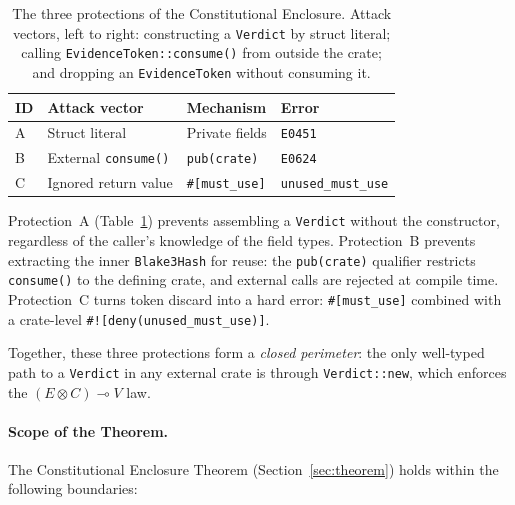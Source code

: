 \begin{table}[t]
\caption{The three protections of the Constitutional Enclosure.  Attack
vectors, left to right: constructing a \texttt{Verdict} by struct literal;
calling \texttt{EvidenceToken::consume()} from outside the crate; and
dropping an \texttt{EvidenceToken} without consuming it.}
\label{tab:protections}
\footnotesize
\begin{tabular}{@{}llll@{}}
\hline
\textbf{ID} & \textbf{Attack vector} & \textbf{Mechanism} & \textbf{Error} \\
\hline
A & Struct literal & Private fields & \texttt{E0451} \\
B & External \texttt{consume()} & \texttt{pub(crate)} & \texttt{E0624} \\
C & Ignored return value & \texttt{\#[must\_use]} & \texttt{unused\_must\_use} \\
\hline
\end{tabular}
\end{table}

Protection~A (Table~\ref{tab:protections}) prevents assembling a
\texttt{Verdict} without the constructor, regardless of the
caller's knowledge of the field types.
Protection~B prevents extracting the inner \texttt{Blake3Hash} for
reuse: the \texttt{pub(crate)} qualifier restricts
\texttt{consume()} to the defining crate, and external calls are
rejected at compile time.
Protection~C turns token discard into a hard error:
\texttt{\#[must\_use]} combined with a crate-level
\texttt{\#![deny(unused\_must\_use)]}.

Together, these three protections form a \emph{closed perimeter}: the
only well-typed path to a \texttt{Verdict} in any external crate is
through \texttt{Verdict::new}, which enforces the $(E \otimes C) \multimap V$
law.

\paragraph*{Scope of the Theorem.}
The Constitutional Enclosure Theorem (Section~\ref{sec:theorem})
holds within the following boundaries:

